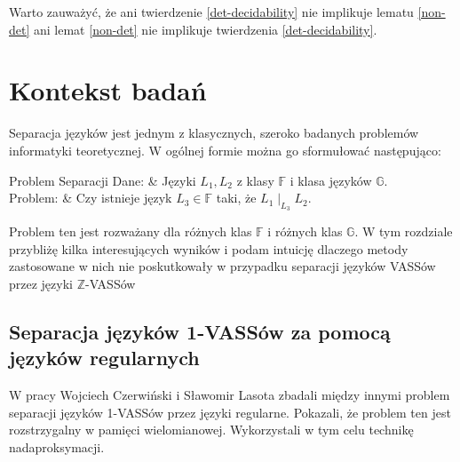     Warto zauważyć, że ani twierdzenie \ref{det-decidability} nie implikuje lematu \ref{non-det} ani lemat \ref{non-det}
    nie implikuje twierdzenia \ref{det-decidability}.


    \chapter{Kontekst badań}
    Separacja języków jest jednym z klasycznych, szeroko badanych problemów informatyki teoretycznej.
    W ogólnej formie można go sformułować następująco:


    \begin{problem}[]{Problem Separacji}
        Dane: & Języki $L_1,L_2$ z klasy $\mathbb{F}$ i klasa języków $\mathbb{G}$.\\
        Problem: & Czy istnieje język $L_3 \in \mathbb{F}$ taki, że $L_1 \mid_{L_3} L_2$. \\
    \end{problem}

    Problem ten jest rozważany dla różnych klas $\mathbb{F}$ i różnych klas $\mathbb{G}$.
    W tym rozdziale przybliżę kilka interesujących wyników i podam intuicję dlaczego metody zastosowane w nich nie
    poskutkowały w przypadku separacji języków VASSów przez języki $\mathbb{Z}$-VASSów


    \section{Separacja języków 1-VASSów za pomocą języków regularnych}
    W pracy \cite{DBLP:conf/lics/CzerwinskiL17} Wojciech Czerwiński i Sławomir Lasota zbadali między innymi
    problem separacji języków 1-VASSów przez języki regularne.
    Pokazali, że problem ten jest rozstrzygalny w pamięci wielomianowej.
    Wykorzystali w tym celu technikę nadaproksymacji.

